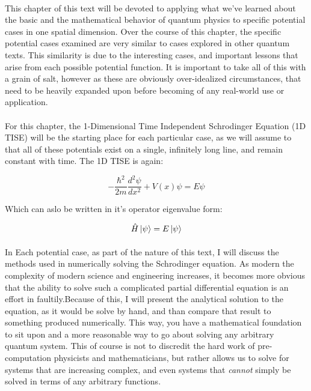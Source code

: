 \documentclass[12pt,letterpaper]{book}
\begin{document}
\paragraph*{}This chapter of this text will be devoted to applying what we've learned about the basic and the mathematical behavior of quantum physics to specific potential cases in one spatial dimension. Over the course of this chapter, the specific potential cases examined are very similar to cases explored in other quantum texts. This similarity is due to the interesting cases, and important lessons that arise from each possible potential function. It is important to take all of this with a grain of salt, however as these are obviously over-idealized circumstances, that need to be heavily expanded upon before becoming of any real-world use or application.

\paragraph*{}For this chapter, the 1-Dimensional Time Independent Schrodinger Equation (1D TISE) will be the starting place for each particular case, as we will assume to that all of these potentials exist on a single, infinitely long line, and remain constant with time. The 1D TISE is again:

\begin{equation}
\label{1D TISE}
-\frac{\hbar^2}{2m}\frac{d^2 \psi}{dx^2} + V(x)\psi = E\psi
\end{equation}

Which can aslo be written in it's operator eigenvalue form:

\begin{equation}
\label{1D TISE Eigen}
\hat{H}\ket{\psi} = E\ket{\psi}
\end{equation}

\paragraph*{}In Each potential case, as part of the nature of this text, I will discuss the methods used in numerically solving the Schrodinger equation. As modern the complexity of modern science and engineering increases, it becomes more obvious that the ability to solve such a complicated partial differential equation is an effort in faultily.Because of this, I will present the analytical solution to the equation, as it would be solve by hand, and than compare that result to something produced numerically. This way, you have a mathematical foundation to sit upon and a more reasonable way to go about solving any arbitrary quantum system. This of course is not to discredit the hard work of pre-computation physicists and mathematicians, but rather allows us to solve for systems that are increasing complex, and even systems that \textit{cannot} simply be solved in terms of any arbitrary functions.
\end{document}
